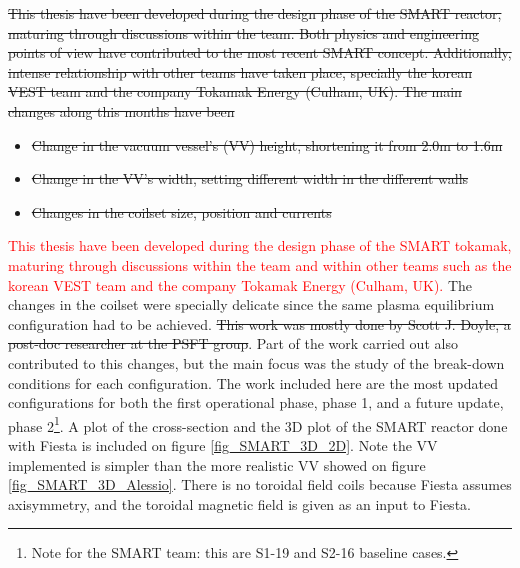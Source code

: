 \documentclass[a4paper,12pt,oneside]{book}
\begin{document}
% 
\st{This thesis have been developed during the design phase of the SMART reactor, maturing through discussions within the team. Both physics and engineering points of view have contributed to the most recent SMART concept. Additionally, intense relationship with other teams have taken place, specially the korean VEST team and the company Tokamak Energy (Culham, UK).
%
The main changes along this months have been }
%
\begin{itemize}
\item \st{Change in the vacuum vessel's (VV) height, shortening it from 2.0m to 1.6m}
\item \st{Change in the VV's width, setting different width in the  different walls}
\item \st{Changes in the coilset size, position and currents}
\end{itemize} 

%
%
%
\textcolor{red}{This thesis have been developed during the design phase of the SMART tokamak, maturing through discussions within the team and within other teams such as the korean VEST team and the company Tokamak Energy (Culham, UK).} The changes in the coilset were specially delicate since the same plasma equilibrium configuration had to be achieved. \st{This work was mostly done by Scott J. Doyle, a post-doc researcher at the PSFT group}. Part of the work carried out also contributed to this changes, but the main focus was the study of the break-down conditions for each configuration. The work included here are the most updated configurations for both the first operational phase, phase 1, and a future update, phase 2\footnote{Note for the SMART team: this are S1-19 and S2-16 baseline cases.}. A plot of the cross-section and the 3D plot of the SMART reactor done with Fiesta is included on figure \ref{fig_SMART_3D_2D}. Note the VV implemented is simpler than the more realistic VV showed on figure \ref{fig_SMART_3D_Alessio}. There is no toroidal field coils because Fiesta assumes axisymmetry, and the toroidal magnetic field is given as an input to Fiesta.
\end{document}
